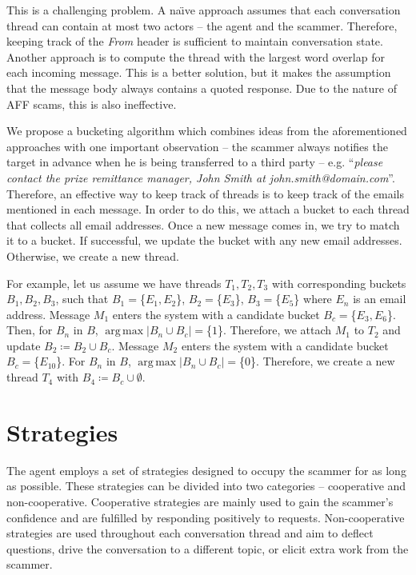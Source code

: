 This is a challenging problem. A na\"{\i}ve approach assumes that each conversation thread can contain at most two actors -- the agent and the scammer. Therefore, keeping track of the \emph{From} header is  sufficient to maintain conversation state. Another approach is to compute the thread with the largest word overlap for each incoming message. This is a better solution, but it makes the assumption that the message body always contains a quoted response. Due to the nature of AFF scams, this is also ineffective.

We propose a bucketing algorithm which combines ideas from the aforementioned approaches with one important observation -- the scammer always notifies the target in advance when he is being transferred to a third party -- e.g. ``\textit{please contact the prize remittance manager, John Smith at john.smith@domain.com}''. Therefore, an effective way to keep track of threads is to keep track of the emails mentioned in each message. In order to do this, we attach a bucket to each thread that collects all email addresses. Once a new message comes in, we try to match it to a bucket. If successful, we update the bucket with any new email addresses. Otherwise, we create a new thread.

For example, let us assume we have threads $T_{1}, T_{2}, T_{3}$ with corresponding buckets $B_{1}, B_{2}, B_{3}$, such that $B_{1} = $\{$E_{1}, E_{2}$\}, $B_{2} = $\{$E_{3}$\}, $B_{3} = $\{$E_{5}$\} where $E_{n}$ is an email address. Message $M_{1}$ enters the system with a candidate bucket $B_{c} = $\{$E_{3}, E_{6}$\}. Then, for $B_{n}$ in $B$, $\operatorname{arg\,max} \left|{B_{n} \cup B_{c}}\right| = $\{$1$\}. Therefore, we attach $M_{1}$ to $T_{2}$ and update $B_{2} \coloneqq B_{2} \cup B_{c}$. Message $M_{2}$ enters the system with a candidate bucket $B_{c} = $\{$E_{10}$\}. For $B_{n}$ in $B$, $\operatorname{arg\,max} \left|{B_{n} \cup B_{c}}\right| = $\{$0$\}. Therefore, we create a new thread $T_{4}$ with $B_{4} \coloneqq B_{c} \cup \emptyset$.

\section{Strategies}
The agent employs a set of strategies designed to occupy the scammer for as long as possible. These strategies can be divided into two categories -- cooperative and non-cooperative. Cooperative strategies are mainly used to gain the scammer's confidence and are fulfilled by responding positively to requests. Non-cooperative strategies are used throughout each conversation thread and aim to deflect questions, drive the conversation to a different topic, or elicit extra work from the scammer.

